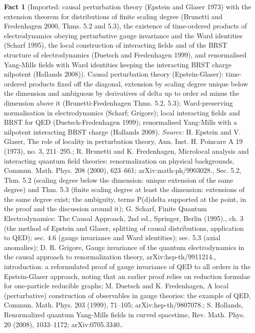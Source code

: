 \documentclass[11pt]{article}
\theoremstyle{definition}
\newtheorem{fact}[theorem]{Fact}
\theoremstyle{plain}
\begin{document}
\begin{fact}[Imported: causal perturbation theory (Epstein and Glaser 1973) with the extension theorem for distributions of finite scaling degree (Brunetti and Fredenhagen 2000, Thms. 5.2 and 5.3), the existence of time-ordered products of electrodynamics obeying perturbative gauge invariance and the Ward identities (Scharf 1995), the local construction of interacting fields and of the BRST structure of electrodynamics (Duetsch and Fredenhagen 1999), and renormalised Yang-Mills fields with Ward identities keeping the interacting BRST charge nilpotent (Hollands 2008)]\label{c:synthesis.imported-epstein-glaser-extension-theorem-and-ward-preserving-time-ordered-products}
Causal perturbation theory (Epstein-Glaser): time-ordered products fixed off the diagonal, extension by scaling degree unique below the dimension and ambiguous by derivatives of delta up to order sd minus the dimension above it (Brunetti-Fredenhagen Thms. 5.2, 5.3); Ward-preserving normalisation in electrodynamics (Scharf; Grigore); local interacting fields and BRST for QED (Duetsch-Fredenhagen 1999); renormalised Yang-Mills with a nilpotent interacting BRST charge (Hollands 2008).
\emph{Source:} H. Epstein and V. Glaser, The role of locality in perturbation theory, Ann. Inst. H. Poincare A 19 (1973), no. 3, 211--295.; R. Brunetti and K. Fredenhagen, Microlocal analysis and interacting quantum field theories: renormalization on physical backgrounds, Commun. Math. Phys. 208 (2000), 623--661; arXiv:math-ph/9903028., Sec. 5.2, Thm. 5.2 (scaling degree below the dimension: unique extension of the same degree) and Thm. 5.3 (finite scaling degree at least the dimension: extensions of the same degree exist; the ambiguity, terms P(d)delta supported at the point, in the proof and the discussion around it); G. Scharf, Finite Quantum Electrodynamics: The Causal Approach, 2nd ed., Springer, Berlin (1995)., ch. 3 (the method of Epstein and Glaser, splitting of causal distributions, application to QED); sec. 4.6 (gauge invariance and Ward identities); sec. 5.3 (axial anomalies); D. R. Grigore, Gauge invariance of the quantum electrodynamics in the causal approach to renormalization theory, arXiv:hep-th/9911214., introduction: a reformulated proof of gauge invariance of QED to all orders in the Epstein-Glaser approach, noting that an earlier proof relies on reduction formulae for one-particle reducible graphs; M. Duetsch and K. Fredenhagen, A local (perturbative) construction of observables in gauge theories: the example of QED, Commun. Math. Phys. 203 (1999), 71--105; arXiv:hep-th/9807078.; S. Hollands, Renormalized quantum Yang-Mills fields in curved spacetime, Rev. Math. Phys. 20 (2008), 1033--1172; arXiv:0705.3340..
\end{fact}
\end{document}
